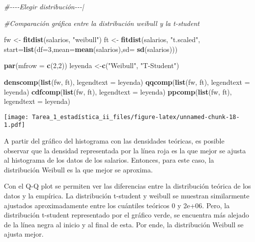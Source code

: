 \documentclass[
]{article}
\newenvironment{Shaded}{\begin{snugshade}}{\end{snugshade}}
\newcommand{\AttributeTok}[1]{\textcolor[rgb]{0.13,0.29,0.53}{#1}}
\newcommand{\CommentTok}[1]{\textcolor[rgb]{0.56,0.35,0.01}{\textit{#1}}}
\newcommand{\DecValTok}[1]{\textcolor[rgb]{0.00,0.00,0.81}{#1}}
\newcommand{\FunctionTok}[1]{\textcolor[rgb]{0.13,0.29,0.53}{\textbf{#1}}}
\newcommand{\NormalTok}[1]{#1}
\newcommand{\OtherTok}[1]{\textcolor[rgb]{0.56,0.35,0.01}{#1}}
\newcommand{\StringTok}[1]{\textcolor[rgb]{0.31,0.60,0.02}{#1}}
\begin{document}
\begin{Shaded}
\begin{Highlighting}[]
\CommentTok{\#{-}{-}{-}{-}Elegir distribución{-}{-}{-}|}

\CommentTok{\#Comparación gráfica entre la distribución weibull y la t{-}student}

\NormalTok{fw }\OtherTok{\textless{}{-}} \FunctionTok{fitdist}\NormalTok{(salarios, }\StringTok{"weibull"}\NormalTok{)}
\NormalTok{ft }\OtherTok{\textless{}{-}} \FunctionTok{fitdist}\NormalTok{(salarios, }\StringTok{"t.scaled"}\NormalTok{, }\AttributeTok{start=}\FunctionTok{list}\NormalTok{(}\AttributeTok{df=}\DecValTok{3}\NormalTok{,}\AttributeTok{mean=}\FunctionTok{mean}\NormalTok{(salarios),}\AttributeTok{sd=} \FunctionTok{sd}\NormalTok{(salarios)))}

\FunctionTok{par}\NormalTok{(}\AttributeTok{mfrow =} \FunctionTok{c}\NormalTok{(}\DecValTok{2}\NormalTok{,}\DecValTok{2}\NormalTok{))}
\NormalTok{leyenda }\OtherTok{\textless{}{-}}\FunctionTok{c}\NormalTok{(}\StringTok{"Weibull"}\NormalTok{, }\StringTok{"T{-}Student"}\NormalTok{)}

\FunctionTok{denscomp}\NormalTok{(}\FunctionTok{list}\NormalTok{(fw, ft), }\AttributeTok{legendtext =}\NormalTok{ leyenda)}
\FunctionTok{qqcomp}\NormalTok{(}\FunctionTok{list}\NormalTok{(fw, ft), }\AttributeTok{legendtext =}\NormalTok{ leyenda)}
\FunctionTok{cdfcomp}\NormalTok{(}\FunctionTok{list}\NormalTok{(fw, ft), }\AttributeTok{legendtext =}\NormalTok{ leyenda)}
\FunctionTok{ppcomp}\NormalTok{(}\FunctionTok{list}\NormalTok{(fw, ft), }\AttributeTok{legendtext =}\NormalTok{ leyenda)}
\end{Highlighting}
\end{Shaded}

\texttt{[image: Tarea\_1\_estadística\_ii\_files/figure-latex/unnamed-chunk-18-1.pdf]}

A partir del gráfico del histograma con las densidades teóricas, es
posible observar que la densidad representada por la línea roja es la
que mejor se ajusta al histograma de los datos de los salarios.
Entonces, para este caso, la distribución Weibull es la que mejor se
aproxima.

Con el Q-Q plot se permiten ver las diferencias entre la distribución
teórica de los datos y la empírica. La distribución t-student y weibull
se muestran similarmente ajustados aproximadamente entre los cuántiles
teóricos 0 y 2e+06. Pero, la distribución t-student representado por el
gráfico verde, se encuentra más alejado de la línea negra al inicio y al
final de esta. Por ende, la distribución Weibull se ajusta mejor.
\end{document}
